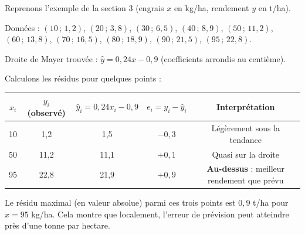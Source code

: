 \documentclass[11pt]{article}
\begin{document}
\begin{exemplebox}
Reprenons l'exemple de la section 3 (engrais $x$ en kg/ha, rendement $y$ en t/ha).

Données : $(10\,;\,1,2)$, $(20\,;\,3,8)$, $(30\,;\,6,5)$, $(40\,;\,8,9)$, $(50\,;\,11,2)$, $(60\,;\,13,8)$, $(70\,;\,16,5)$, $(80\,;\,18,9)$, $(90\,;\,21,5)$, $(95\,;\,22,8)$.

Droite de Mayer trouvée : $\hat{y} = 0,24x - 0,9$ (coefficients arrondis au centième).

Calculons les résidus pour quelques points :
\begin{center}
\begin{tabular}{|c|c|c|c|c|}\hline
$x_i$ & $y_i$ (observé) & $\hat{y}_i = 0,24x_i - 0,9$ & $e_i = y_i - \hat{y}_i$ & Interprétation \\ \hline
10 & 1,2 & 1,5 & $-0,3$ & Légèrement sous la tendance \\ \hline
50 & 11,2 & 11,1 & $+0,1$ & Quasi sur la droite \\ \hline
95 & 22,8 & 21,9 & $+0,9$ & \textbf{Au-dessus} : meilleur rendement que prévu \\ \hline
\end{tabular}
\end{center}
Le résidu maximal (en valeur absolue) parmi ces trois points est $0,9$ t/ha pour $x = 95$ kg/ha. Cela montre que localement, l'erreur de prévision peut atteindre près d'une tonne par hectare.
\end{exemplebox}
\end{document}
